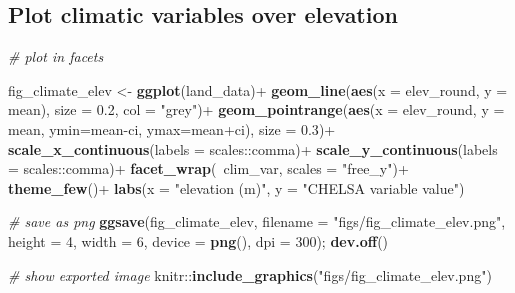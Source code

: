 \documentclass[]{article}
\newenvironment{Shaded}{}{}
\newcommand{\CommentTok}[1]{\textcolor[rgb]{0.38,0.63,0.69}{\textit{#1}}}
\newcommand{\DataTypeTok}[1]{\textcolor[rgb]{0.56,0.13,0.00}{#1}}
\newcommand{\DecValTok}[1]{\textcolor[rgb]{0.25,0.63,0.44}{#1}}
\newcommand{\FloatTok}[1]{\textcolor[rgb]{0.25,0.63,0.44}{#1}}
\newcommand{\KeywordTok}[1]{\textcolor[rgb]{0.00,0.44,0.13}{\textbf{#1}}}
\newcommand{\NormalTok}[1]{#1}
\newcommand{\OperatorTok}[1]{\textcolor[rgb]{0.40,0.40,0.40}{#1}}
\newcommand{\StringTok}[1]{\textcolor[rgb]{0.25,0.44,0.63}{#1}}
\begin{document}
\hypertarget{plot-climatic-variables-over-elevation}{%
\subsection{Plot climatic variables over elevation}\label{plot-climatic-variables-over-elevation}}

\begin{Shaded}
\begin{Highlighting}[]
\CommentTok{# plot in facets}

\NormalTok{fig_climate_elev <-}\StringTok{ }\KeywordTok{ggplot}\NormalTok{(land_data)}\OperatorTok{+}
\StringTok{  }\KeywordTok{geom_line}\NormalTok{(}\KeywordTok{aes}\NormalTok{(}\DataTypeTok{x =}\NormalTok{ elev_round, }\DataTypeTok{y =}\NormalTok{ mean),}
            \DataTypeTok{size =} \FloatTok{0.2}\NormalTok{, }\DataTypeTok{col =} \StringTok{"grey"}\NormalTok{)}\OperatorTok{+}
\StringTok{  }\KeywordTok{geom_pointrange}\NormalTok{(}\KeywordTok{aes}\NormalTok{(}\DataTypeTok{x =}\NormalTok{ elev_round, }\DataTypeTok{y =}\NormalTok{ mean, }\DataTypeTok{ymin=}\NormalTok{mean}\OperatorTok{-}\NormalTok{ci, }\DataTypeTok{ymax=}\NormalTok{mean}\OperatorTok{+}\NormalTok{ci),}
                  \DataTypeTok{size =} \FloatTok{0.3}\NormalTok{)}\OperatorTok{+}
\StringTok{  }\KeywordTok{scale_x_continuous}\NormalTok{(}\DataTypeTok{labels =}\NormalTok{ scales}\OperatorTok{::}\NormalTok{comma)}\OperatorTok{+}
\StringTok{  }\KeywordTok{scale_y_continuous}\NormalTok{(}\DataTypeTok{labels =}\NormalTok{ scales}\OperatorTok{::}\NormalTok{comma)}\OperatorTok{+}
\StringTok{  }\KeywordTok{facet_wrap}\NormalTok{(}\OperatorTok{~}\NormalTok{clim_var, }\DataTypeTok{scales =} \StringTok{"free_y"}\NormalTok{)}\OperatorTok{+}
\StringTok{  }\KeywordTok{theme_few}\NormalTok{()}\OperatorTok{+}
\StringTok{  }\KeywordTok{labs}\NormalTok{(}\DataTypeTok{x =} \StringTok{"elevation (m)"}\NormalTok{, }\DataTypeTok{y =} \StringTok{"CHELSA variable value"}\NormalTok{)}

\CommentTok{# save as png}
\KeywordTok{ggsave}\NormalTok{(fig_climate_elev, }\DataTypeTok{filename =} \StringTok{"figs/fig_climate_elev.png"}\NormalTok{, }
       \DataTypeTok{height =} \DecValTok{4}\NormalTok{, }\DataTypeTok{width =} \DecValTok{6}\NormalTok{, }\DataTypeTok{device =} \KeywordTok{png}\NormalTok{(), }\DataTypeTok{dpi =} \DecValTok{300}\NormalTok{); }\KeywordTok{dev.off}\NormalTok{()}
\end{Highlighting}
\end{Shaded}

\begin{Shaded}
\begin{Highlighting}[]

\CommentTok{# show exported image}
\NormalTok{knitr}\OperatorTok{::}\KeywordTok{include_graphics}\NormalTok{(}\StringTok{"figs/fig_climate_elev.png"}\NormalTok{)}
\end{Highlighting}
\end{Shaded}
\end{document}
